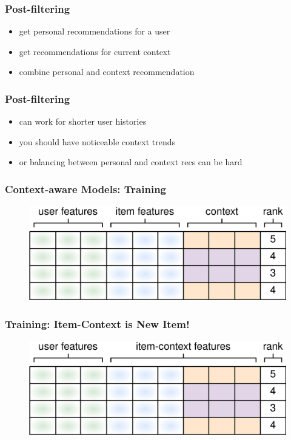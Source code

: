 \documentclass{beamer}
\begin{document}
\begin{frame}
  \frametitle{Post-filtering}
  \begin{itemize}
  \item get personal recommendations for a user
  \item get recommendations for current context
  \item combine personal and context recommendation
  \end{itemize}
\end{frame}
\begin{frame}
  \frametitle{Post-filtering}
  \begin{itemize}
  \item can work for shorter user histories
  \item you should have noticeable context trends
  \item or balancing between personal and context recs can be hard
  \end{itemize}
\end{frame}
\begin{frame}
  \frametitle{Context-aware Models: Training}
  \begin{figure}
  \includegraphics[scale=0.25]{context-aware-1}
  \end{figure}
\end{frame}
\begin{frame}
  \frametitle{Training: Item-Context is New Item!}
  \begin{figure}
  \includegraphics[scale=0.25]{context-aware-2}
  \end{figure}
\end{frame}
\end{document}
